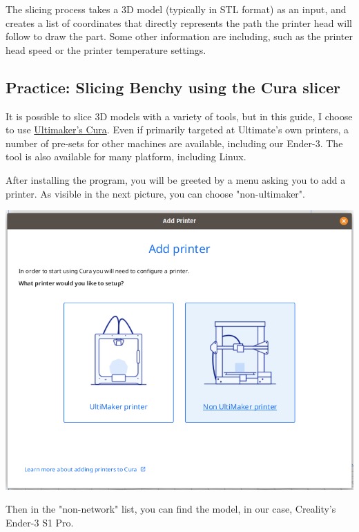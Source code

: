 \documentclass[a4paper,11pt]{article}
\begin{document}
The slicing process takes a 3D model (typically in STL format) as an input, and creates a list of coordinates that directly represents
the path the printer head will follow to draw the part. Some other information are including, such as the printer head
speed or the printer temperature settings.

\subsection{Practice: Slicing Benchy using the Cura slicer}
\label{sec:orgf5fa04d}
It is possible to slice 3D models with a variety of tools, but in this guide, I choose to use
\href{https://ultimaker.com/software/ultimaker-cura/}{Ultimaker's Cura}. Even if primarily targeted at Ultimate's own printers, a number of
pre-sets for other machines are available, including our Ender-3.
The tool is also available for many platform, including Linux.

After installing the program, you will be greeted by a menu asking you to add a printer.
As visible in the next picture, you can choose "non-ultimaker".

\begin{center}
\includegraphics[width=.9\linewidth]{img/cura/1.png}
\end{center}

Then in the "non-network" list, you can find the model, in our case, Creality's Ender-3 S1 Pro.
\end{document}
